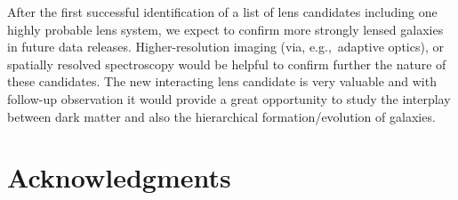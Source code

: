 \documentclass[apj]{emulateapj}
\def\eg{{e.g.,}}
\begin{document}
After the first successful identification of a list of lens candidates including one highly probable lens system, we expect to 
confirm more strongly lensed galaxies in future data releases. 
Higher-resolution imaging (via, \eg\ adaptive optics), or spatially resolved spectroscopy would be helpful to confirm further the nature of these candidates.
The new interacting lens candidate is very valuable and with follow-up observation it would provide a great opportunity to study 
the interplay between dark matter and also the hierarchical formation/evolution of galaxies.


 

\section*{Acknowledgments}
\end{document}

